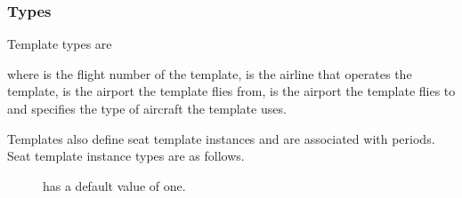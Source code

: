 \subsubsection{Types}
Template types are
\begin{description}
  \item[] 
  \item[] 
  \item[] 
\end{description}
where  is the flight number of the template,  is the
airline that operates the template,  is the airport the template flies
from,  is the airport the template flies to and  specifies the
type of aircraft the template uses.

Templates also define seat template instances and are associated with periods.
Seat template instance types are as follows.
\begin{description}
  \item[] 

     has a default value of one.
\end{description}


